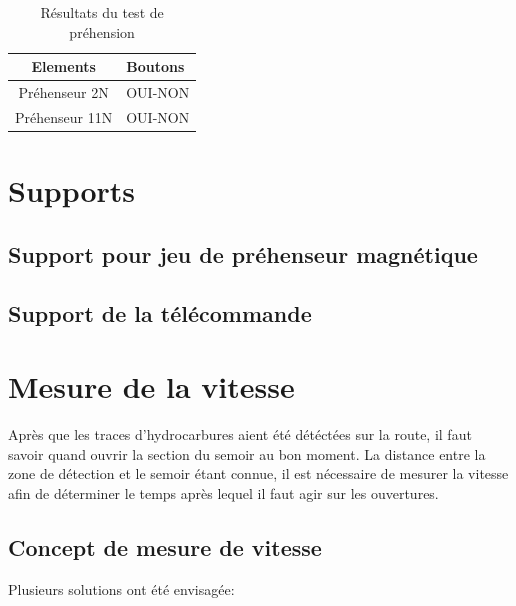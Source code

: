\begin{table}[h]
    \begin{center}
        \caption{Résultats du test de préhension}
        \begin{tabular}{|c|l|}
            Elements       & Boutons \\ \hline
            Préhenseur 2N  & OUI-NON \\
            Préhenseur 11N & OUI-NON \\
        \end{tabular}
    \end{center}
\end{table}

\section{Supports}

\subsection{Support pour jeu de préhenseur magnétique}
\subsection{Support de la télécommande}

\section{Mesure de la vitesse}
Après que les traces d'hydrocarbures aient été détéctées sur la route, il faut savoir quand ouvrir la section du semoir au bon moment. La distance entre la zone de détection et le semoir étant connue,
il est nécessaire de mesurer la vitesse afin de déterminer le temps après lequel il faut agir sur les ouvertures.
\subsection{Concept de mesure de vitesse}
Plusieurs solutions ont été envisagée:

